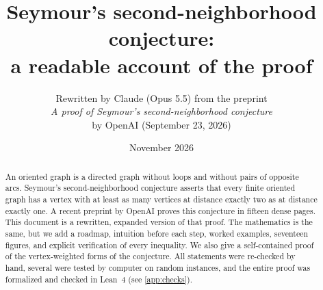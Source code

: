 \documentclass[11pt]{article}
\title{Seymour's second-neighborhood conjecture:\\ a readable account of the proof}
\author{Rewritten by Claude (Opus 5.5) from the preprint\\
\emph{A proof of Seymour's second-neighborhood conjecture}\\ by OpenAI (September 23, 2026)}
\date{November 2026}
\begin{document}
\maketitle

\begin{abstract}
An oriented graph is a directed graph without loops and without pairs of
opposite arcs. Seymour's second-neighborhood conjecture asserts that every
finite oriented graph has a vertex with at least as many vertices at
distance exactly two as at distance exactly one. A recent preprint by
OpenAI proves this conjecture in fifteen dense pages. This document
is a rewritten, expanded version of that proof. The mathematics is the same,
but we add a roadmap, intuition before each step, worked examples,
seventeen figures, and explicit verification of every inequality. We also
give a self-contained proof of the vertex-weighted forms of the conjecture.
All statements were re-checked by hand, several were tested by computer on
random instances, and the entire proof was formalized and checked in Lean~4 (see
\cref{app:checks}).
\end{abstract}

\setcounter{tocdepth}{2}
\tableofcontents







\appendix




\end{document}
